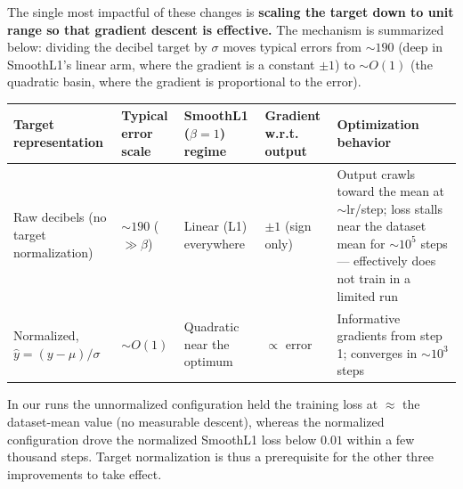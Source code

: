 \documentclass[
]{article}
\begin{document}
The single most impactful of these changes is \textbf{scaling the target
down to unit range so that gradient descent is effective.} The mechanism
is summarized below: dividing the decibel target by \(\sigma\) moves
typical errors from \(\sim190\) (deep in SmoothL1's linear arm, where
the gradient is a constant \(\pm1\)) to \(\sim\!O(1)\) (the quadratic
basin, where the gradient is proportional to the error).

\begin{longtable}[]{@{}
  >{\raggedright\arraybackslash}p{}
  >{\raggedright\arraybackslash}p{}
  >{\raggedright\arraybackslash}p{}
  >{\raggedright\arraybackslash}p{}
  >{\raggedright\arraybackslash}p{}@{}}
\toprule\noalign{}
\begin{minipage}[b]{\linewidth}\raggedright
Target representation
\end{minipage} & \begin{minipage}[b]{\linewidth}\raggedright
Typical error scale
\end{minipage} & \begin{minipage}[b]{\linewidth}\raggedright
SmoothL1 (\(\beta{=}1\)) regime
\end{minipage} & \begin{minipage}[b]{\linewidth}\raggedright
Gradient w.r.t. output
\end{minipage} & \begin{minipage}[b]{\linewidth}\raggedright
Optimization behavior
\end{minipage} \\
\midrule\noalign{}
\endhead
\bottomrule\noalign{}
\endlastfoot
Raw decibels (no target normalization) & \(\sim190\) (\(\gg\beta\)) &
Linear (L1) everywhere & \(\pm1\) (sign only) & Output crawls toward the
mean at \(\sim\)lr/step; loss stalls near the dataset mean for
\(\sim10^5\) steps --- effectively does not train in a limited run \\
Normalized, \(\hat{y}=(y-\mu)/\sigma\) & \(\sim\!O(1)\) & Quadratic near
the optimum & \(\propto\) error & Informative gradients from step 1;
converges in \(\sim10^3\) steps \\
\end{longtable}

In our runs the unnormalized configuration held the training loss at
\(\approx\) the dataset-mean value (no measurable descent), whereas the
normalized configuration drove the normalized SmoothL1 loss below
\(0.01\) within a few thousand steps. Target normalization is thus a
prerequisite for the other three improvements to take effect.
\end{document}
